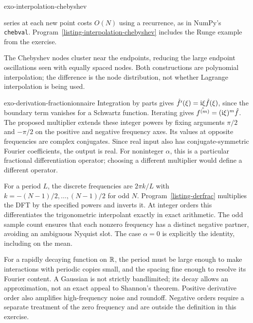 \begin{correction}{exo-interpolation-chebyshev}
\begin{enumerate}
series at each new point costs $O(N)$ using a recurrence, as in NumPy's
\texttt{chebval}. Program~\ref{listing-interpolation-chebyshev} includes the
Runge example from the exercise.
\begin{listing}[H]
\caption{Chebyshev interpolation and the Runge example.}
\label{listing-interpolation-chebyshev}
\end{listing}
\end{enumerate}
The Chebyshev nodes cluster near the endpoints, reducing the large endpoint
oscillations seen with equally spaced nodes. Both constructions are polynomial
interpolation; the difference is the node distribution, not whether Lagrange
interpolation is being used.
\end{correction}

\begin{correction}{exo-derivation-fractionionnaire}
Integration by parts gives $\hat{f'}(\xi)=\mathrm{i}\xi\hat{f}(\xi)$, since the
boundary term vanishes for a Schwartz function. Iterating gives
$\hat{f^{(m)}}=(\mathrm{i}\xi)^m\hat{f}$.
The proposed multiplier extends these integer powers by fixing arguments
$\pi/2$ and $-\pi/2$ on the positive and negative frequency axes.
Its values at opposite frequencies are complex conjugates. Since real input
also has conjugate-symmetric Fourier coefficients, the output is real.
For noninteger $\alpha$, this is a particular fractional differentiation
operator; choosing a different multiplier would define a different operator.

For a period $L$, the discrete frequencies are $2\pi k/L$ with
$k=-(N-1)/2,\ldots,(N-1)/2$ for odd $N$.
Program~\ref{listing-derfrac} multiplies the DFT by the specified powers and
inverts it. At integer orders this differentiates the trigonometric interpolant
exactly in exact arithmetic. The odd sample count ensures that each nonzero
frequency has a distinct negative partner, avoiding an ambiguous Nyquist slot.
The case $\alpha=0$ is explicitly the identity, including on the mean.
\begin{listing}[H]
\caption{A periodic fractional derivative with explicit order and period.}
\label{listing-derfrac}
\end{listing}
For a rapidly decaying function on $\mathbb{R}$, the period must be large enough to
make interactions with periodic copies small, and the spacing fine enough to
resolve its Fourier content. A Gaussian is not strictly bandlimited; its decay
allows an approximation, not an exact appeal to Shannon's theorem.
Positive derivative order also amplifies high-frequency noise and roundoff.
Negative orders require a separate treatment of the zero frequency and are
outside the definition in this exercise.
\end{correction}

